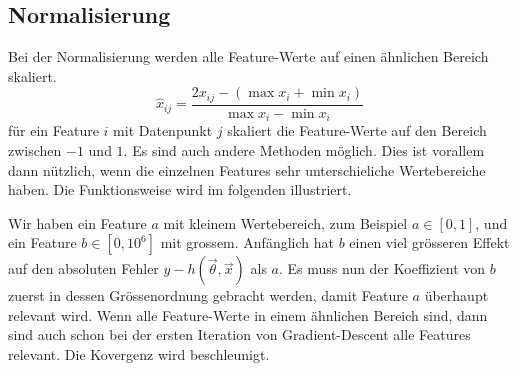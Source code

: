 \subsection{Normalisierung}

Bei der Normalisierung werden alle Feature-Werte auf einen ähnlichen Bereich skaliert.
\begin{equation}
    \hat x_{ij} = \frac{2x_{ij} - (\max x_i + \min x_i)}{\max x_i - \min x_i}
\end{equation}
für ein Feature $i$ mit Datenpunkt $j$ skaliert die Feature-Werte auf den Bereich zwischen $-1$
und $1$. Es sind auch andere Methoden möglich. Dies ist vorallem dann nützlich, wenn die
einzelnen Features sehr unterschieliche Wertebereiche haben.
Die Funktionsweise wird im folgenden illustriert.

Wir haben ein Feature $a$ mit kleinem Wertebereich, zum Beispiel $a \in [0, 1]$, und ein
Feature $b \in [0, 10^6]$ mit grossem. Anfänglich hat $b$ einen viel grösseren
Effekt auf den absoluten Fehler $y - h(\vec \theta, \vec x)$ als $a$. Es muss nun
der Koeffizient von $b$ zuerst in dessen Grössenordnung gebracht werden, damit Feature $a$
überhaupt relevant wird. Wenn alle Feature-Werte in einem ähnlichen Bereich sind,
dann sind auch schon bei der ersten Iteration von Gradient-Descent alle Features relevant. Die
Kovergenz wird beschleunigt.